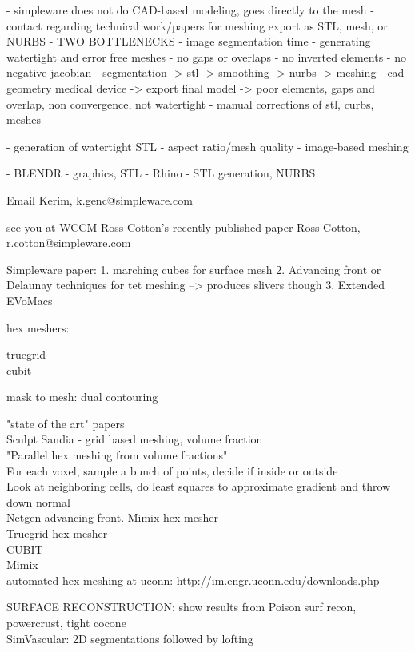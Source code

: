 - simpleware does not do CAD-based modeling, goes directly to the mesh
- contact regarding technical work/papers for meshing
export as STL, mesh, or NURBS
- TWO BOTTLENECKS
  - image segmentation time
  - generating watertight and error free meshes
    - no gaps or overlaps 
    - no inverted elements 
    - no negative jacobian
- segmentation -> stl -> smoothing -> nurbs -> meshing -  cad geometry medical device -> export final model -> poor elements, gaps and overlap, non convergence, not watertight
- manual corrections of stl, curbs, meshes

- generation of watertight STL
- aspect ratio/mesh quality
- image-based meshing

- BLENDR - graphics, STL
- Rhino - STL generation, NURBS

Email Kerim, k.genc@simpleware.com

see you at WCCM
Ross Cotton’s recently published paper
Ross Cotton, r.cotton@simpleware.com

Simpleware paper:
1. marching cubes for surface mesh
2. Advancing front or Delaunay techniques for tet meshing --> produces slivers though
3. Extended EVoMacs

hex meshers:

truegrid\\
cubit

mask to mesh:
dual contouring

"state of the art" papers\\
Sculpt Sandia - grid based meshing, volume fraction \\
"Parallel hex meshing from volume fractions"\\
For each voxel, sample a bunch of points, decide if inside or outside \\
Look at neighboring cells, do least squares to approximate gradient and throw down normal \\

Netgen advancing front. Mimix hex mesher \\

Truegrid hex mesher \\
CUBIT \\
Mimix \\

automated hex meshing at uconn: http://im.engr.uconn.edu/downloads.php


SURFACE RECONSTRUCTION:
show results from Poison surf recon, powercrust, tight cocone \\

SimVascular: 2D segmentations followed by lofting



